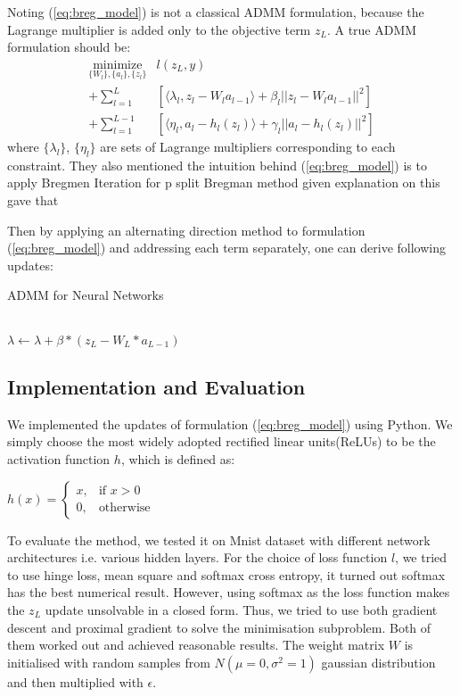 \documentclass[letterpaper, 10 pt, conference]{ieeeconf}  %
\begin{document}
Noting (\ref{eq:breg_model}) is not a classical ADMM formulation, because the Lagrange multiplier is added only to the objective term $z_L$. A true ADMM formulation should be:
\begin{equation}
\begin{aligned}
\underset{\{W_l\},\{a_l\}, \{z_l\}}{\text{minimize}} & l(z_L,y) \\
+  \sum_{l=1}^{L}&[\langle \lambda_l, z_l - W_la_{l-1} \rangle + \beta_l||z_l - W_la_{l-1}||^2] \\
+ \sum_{l=1}^{L-1}&[\langle \eta_l, a_l - h_l(z_l) \rangle + \gamma_l||a_l - h_l(z_l)||^2 ]
\label{eq:admm_model}
\end{aligned}
\end{equation}
where $\{\lambda_l\}$, $\{\eta_l\}$ are sets of Lagrange multipliers corresponding to each constraint. They also mentioned the intuition behind (\ref{eq:breg_model}) is to apply Bregmen Iteration for p split Bregman method given explanation on this  gave that

Then by applying an alternating direction method to formulation (\ref{eq:breg_model}) and addressing each term separately, one can derive following updates:
\begin{algorithm} 
\caption{ADMM for Neural Networks}
	\begin{algorithmic}
		
		\EndFor \\
		$\lambda \leftarrow \lambda+\beta*(z_L - W_L*a_{L-1})$			\end{algorithmic}
\end{algorithm}

\subsection{Implementation and Evaluation}
We implemented the updates of formulation (\ref{eq:breg_model}) using Python. We simply choose the most widely adopted rectified linear units(ReLUs) to be the activation function $h$, which is defined as:
\begin{center}
$h(x) = \begin{cases} x, & \mbox{if } x> 0 \\0, & \mbox{otherwise } \end{cases} $
\end{center}

To evaluate the method, we tested it on Mnist dataset with different network architectures i.e. various hidden layers. For the choice of loss function $l$, we tried to use hinge loss, mean square and softmax cross entropy, it turned out softmax has the best numerical result. However, using softmax as the loss function makes the $z_L$ update unsolvable in a closed form. Thus, we tried to use both gradient descent and proximal gradient to solve the minimisation subproblem. Both of them worked out and achieved reasonable results. The weight matrix $W$ is initialised with random samples from $N(\mu=0, \sigma^2=1)$ gaussian distribution and then multiplied with $\epsilon$. 
\end{document}
